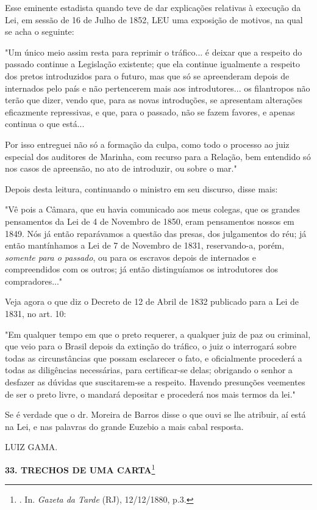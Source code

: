 Esse eminente estadista quando teve de dar explicações relativas à
execução da Lei, em sessão de 16 de Julho de 1852, LEU uma exposição de
motivos, na qual se acha o seguinte:

"Um único meio assim resta para reprimir o tráfico... é deixar que a
respeito do passado continue a Legislação existente; que ela continue
igualmente a respeito dos pretos introduzidos para o futuro, mas que só
se apreenderam depois de internados pelo país e não pertencerem mais aos
introdutores... os filantropos não terão que dizer, vendo que, para as
novas introduções, se apresentam alterações eficazmente repressivas, e
que, para o passado, não se fazem favores, e apenas continua o que
está...

Por isso entreguei não só a formação da culpa, como todo o processo ao
juiz especial dos auditores de Marinha, com recurso para a Relação, bem
entendido só nos casos de apreensão, no ato de introduzir, ou sobre o
mar."

Depois desta leitura, continuando o ministro em seu discurso, disse
mais:

"Vê pois a Câmara, que eu havia comunicado aos meus colegas, que os
grandes pensamentos da Lei de 4 de Novembro de 1850, eram pensamentos
nossos em 1849. Nós já então reparávamos a questão das presas, dos
julgamentos do réu; já então mantínhamos a Lei de 7 de Novembro de 1831,
reservando-a, porém, \emph{somente para o passado}, ou para os escravos
depois de internados e compreendidos com os outros; já então
distinguíamos os introdutores dos compradores..."

Veja agora o que diz o Decreto de 12 de Abril de 1832 publicado para a
Lei de 1831, no art. 10:

"Em qualquer tempo em que o preto requerer, a qualquer juiz de paz ou
criminal, que veio para o Brasil depois da extinção do tráfico, o juiz o
interrogará sobre todas as circunstâncias que possam esclarecer o fato,
e oficialmente procederá a todas as diligências necessárias, para
certificar-se delas; obrigando o senhor a desfazer as dúvidas que
suscitarem-se a respeito. Havendo presunções veementes de ser o preto
livre, o mandará depositar e procederá nos mais termos da lei."

Se é verdade que o dr. Moreira de Barros disse o que ouvi se lhe
atribuir, aí está na Lei, e nas palavras do grande Euzebio a mais cabal
resposta.

LUIZ GAMA.

\textbf{33. TRECHOS DE UMA CARTA}\footnote{. In. \emph{Gazeta da Tarde}
  (RJ), 12/12/1880, p.3.}

